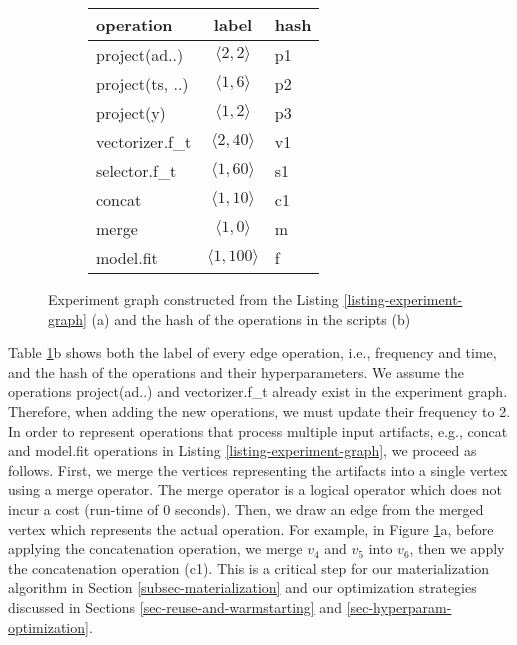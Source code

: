 \begin{figure}
\begin{subfigure}[b]{0.4\linewidth}
\centering

\caption{}
\end{subfigure}%
\begin{subfigure}[b]{0.6\linewidth}
\begin{tabular}{lcl}
\hline
operation & label &  hash \\
\hline
project(ad..) & $\langle 2, 2\rangle$ &p1 \\
project(ts, ..) & $\langle 1, 6\rangle$ & p2\\
project(y) & $\langle 1, 2\rangle$ & p3\\
vectorizer.f\_t & $\langle 2, 40\rangle$ & v1 \\
selector.f\_t & $\langle 1, 60\rangle$ & s1 \\
concat & $\langle 1, 10\rangle$ & c1 \\
merge & $\langle 1, 0 \rangle$ & m\\
model.fit & $\langle 1, 100\rangle$ & f\\
\hline
\end{tabular}
\caption{}
\end{subfigure}
\caption{Experiment graph constructed from the Listing \ref{listing-experiment-graph} (a) and the hash of the operations in the scripts (b)}
\label{fig-experiment-graph}
\end{figure}
Table \ref{fig-experiment-graph}b shows both the label of every edge operation, i.e., frequency and time, and the hash of the operations and their hyperparameters.
We assume the operations project(ad..) and vectorizer.f\_t already exist in the experiment graph.
Therefore, when adding the new operations, we must update their frequency to 2.
In order to represent operations that process multiple input artifacts, e.g., concat and model.fit operations in Listing \ref{listing-experiment-graph}, we proceed as follows.
First, we merge the vertices representing the artifacts into a single vertex using a merge operator.
The merge operator is a logical operator which does not incur a cost (run-time of 0 seconds).
Then, we draw an edge from the merged vertex which represents the actual operation.
For example, in Figure \ref{fig-experiment-graph}a, before applying the concatenation operation, we merge $v_4$ and $v_5$ into $v_6$, then we apply the concatenation operation (c1).
This is a critical step for our materialization algorithm in Section \ref{subsec-materialization} and our optimization strategies discussed in Sections \ref{sec-reuse-and-warmstarting} and \ref{sec-hyperparam-optimization}.

